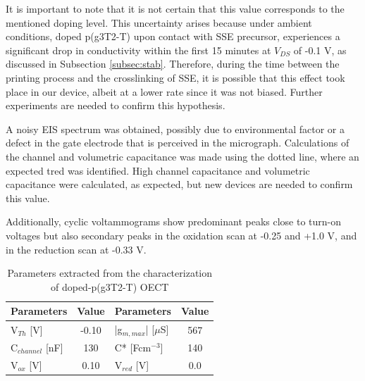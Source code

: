 It is important to note that it is not certain that this value corresponds to the mentioned doping level. This uncertainty arises because under ambient conditions, doped p(g3T2-T) upon contact with SSE precursor, experiences a significant drop in conductivity within the first 15 minutes at $V_{DS}$ of -0.1 V, as discussed in Subsection \ref{subsec:stab}. Therefore, during the time between the printing process and the crosslinking of SSE, it is possible that this effect took place in our device, albeit at a lower rate since it was not biased. Further experiments are needed to confirm this hypothesis.

A noisy EIS spectrum was obtained, possibly due to environmental factor or a defect in the gate electrode that is perceived in the micrograph. Calculations of the channel and volumetric capacitance was made using the dotted line, where an expected tred was identified. High channel capacitance and volumetric capacitance were calculated, as expected, but new devices are needed to confirm this value.  %

Additionally, cyclic voltammograms show predominant peaks close to turn-on voltages but also secondary peaks in the oxidation scan at -0.25 and +1.0 V, and in the reduction scan at -0.33 V. 

\begin{table}[ht]
\centering
\caption{Parameters extracted from the characterization of doped-p(g3T2-T) OECT}
\begin{tabular}{l|c||l|c}
Parameters & Value & Parameters & Value \\\hline \hline
V$_{Th}$ [V] & -0.10 & |g$_{m,max}$| [$\mu$S] & 567 \\
C$_{channel}$ [nF] & 130 & C* [Fcm$^{-3}$] &  140 \\
V$_{ox}$ [V] & 0.10 & V$_{red}$ [V] & 0.0 \\\hline
\end{tabular}
\label{tab:dopedfom}
\end{table}


